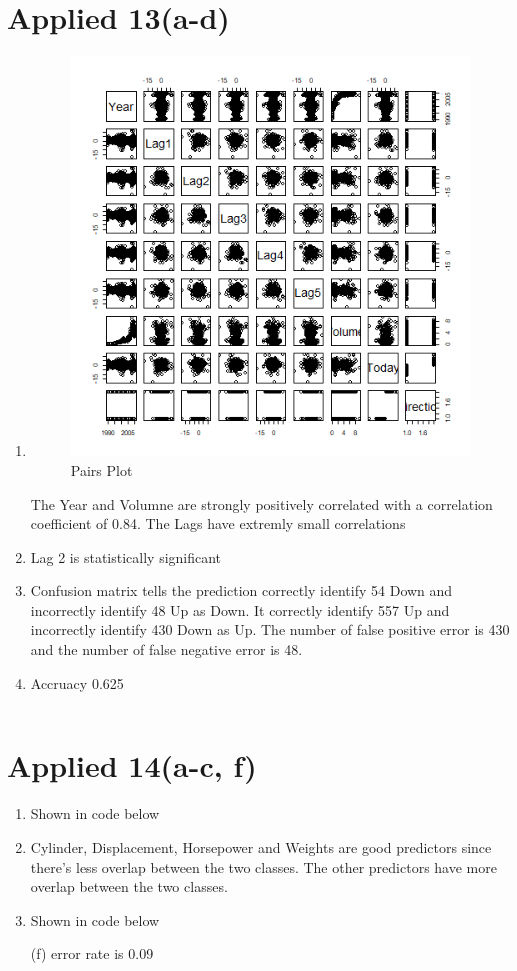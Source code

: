 \documentclass{article}
\begin{document}
\section{Applied 13(a-d)}
\begin{enumerate}[label=(\alph*)]
\item
\begin{figure}[h]
\centering
\includegraphics{pairs.png}
\caption{Pairs Plot}
\end{figure}
The Year and Volumne are strongly positively correlated with a correlation coefficient of 0.84. The Lags have extremly small correlations

\item Lag 2 is statistically significant
\item Confusion matrix tells the prediction correctly identify 54 Down and incorrectly identify 48 Up as Down. It correctly identify 557 Up and incorrectly identify 430 Down as Up. The number of false positive error is 430 and the number of false negative error is 48.

\item Accruacy 0.625 
\end{enumerate}
\newpage
\inputminted{r}{q13.R}
\newpage
\section{Applied 14(a-c, f)}
\begin{enumerate}[label=(\alph*)]
\item Shown in code below
\item Cylinder, Displacement, Horsepower and Weights are good predictors since there's less overlap between the two classes. The other predictors have more overlap between the two classes.
\item Shown in code below
\item[(f)] error rate is 0.09
\inputminted{r}{q14.R}
\end{enumerate}
\end{document}
